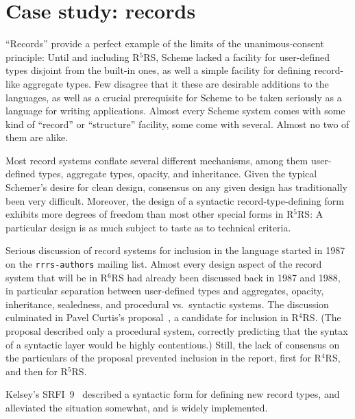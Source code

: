 \documentclass{sigplanconf}
\newcommand{\rn}[1]{R$^{#1}$RS}
\begin{document}
\section{Case study: records}
\label{sec:records}

``Records'' provide a perfect example of the limits of the
unanimous-consent principle: Until and including \rn{5}, Scheme lacked
a facility for user-defined types disjoint from the built-in ones, as
well a simple facility for defining record-like aggregate types.  Few
disagree that it these are desirable additions to the languages, as
well as a crucial prerequisite for Scheme to be taken seriously as a
language for writing applications.  Almost every Scheme system comes
with some kind of ``record'' or ``structure'' facility, some come with
several.  Almost no two of them are alike.

Most record systems conflate several different mechanisms, among them
user-defined types, aggregate types, opacity, and inheritance.  Given
the typical Schemer's desire for clean design, consensus on any given
design has traditionally been very difficult.  Moreover, the design of
a syntactic record-type-defining form exhibits more degrees of freedom
than most other special forms in \rn{5}: A particular design is as
much subject to taste as to technical criteria.

Serious discussion of record systems for inclusion in the language
started in 1987 on the \texttt{rrrs-authors} mailing list.  Almost
every design aspect of the record system that will be in \rn{6} had already
been discussed back in 1987 and 1988, in particular separation between
user-defined types and aggregates, opacity, inheritance, sealedness,
and procedural vs.\ syntactic systems.  The discussion culminated in
Pavel Curtis's proposal~\cite{Curtis1991}, a candidate for inclusion
in \rn{4}.  (The proposal described only a procedural system,
correctly predicting that the syntax of a syntactic layer would be
highly contentious.)  Still, the lack of consensus on the particulars
of the proposal prevented inclusion in the report, first for \rn{4},
and then for \rn{5}.

Kelsey's SRFI~9~\cite{srfi9} described a syntactic form for
defining new record types, and alleviated the situation somewhat, and
is widely implemented.
\end{document}
